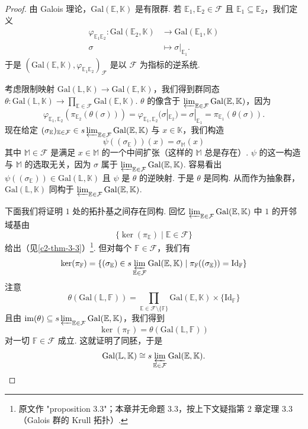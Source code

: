 \begin{proof}
由 Galois 理论，$\mathrm{Gal}(\mathbb{E},\mathbb{K})$ 是有限群. 若 $\mathbb{E}_1,\mathbb{E}_2\in\mathcal{F}$ 且 $\mathbb{E}_1\subseteq\mathbb{E}_2$，我们定义
\[
\begin{aligned}
\varphi_{\mathbb{E}_1\mathbb{E}_2}:\mathrm{Gal}(\mathbb{E}_2,\mathbb{K})&\longrightarrow\mathrm{Gal}(\mathbb{E}_1,\mathbb{K})\\
\sigma&\longmapsto\sigma|_{\mathbb{E}_1}.
\end{aligned}
\]
于是 $(\mathrm{Gal}(\mathbb{E},\mathbb{K}),\varphi_{\mathbb{E}_1\mathbb{E}_2})_{\mathcal{F}}$ 是以 $\mathcal{F}$ 为指标的逆系统.

考虑限制映射 $\mathrm{Gal}(\mathbb{L},\mathbb{K})\to\mathrm{Gal}(\mathbb{E},\mathbb{K})$，我们得到群同态 $\theta:\mathrm{Gal}(\mathbb{L},\mathbb{K})\to\prod_{\mathbb{E}\in\mathcal{F}}\mathrm{Gal}(\mathbb{E},\mathbb{K})$. $\theta$ 的像含于 $\varprojlim_{\mathbb{E}\in\mathcal{F}}\mathrm{Gal}(\mathbb{E},\mathbb{K})$，因为
\[
\varphi_{\mathbb{E}_1,\mathbb{E}_2}(\pi_{\mathbb{E}_2}(\theta(\sigma)))=\varphi_{\mathbb{E}_1,\mathbb{E}_2}(\sigma|_{\mathbb{E}_2})=\sigma|_{\mathbb{E}_1}=\pi_{\mathbb{E}_1}(\theta(\sigma)).
\]
现在给定 $(\sigma_\mathbb{E})_{\mathbb{E}\in\mathcal{F}}\in s\varprojlim_{\mathbb{E}\in\mathcal{F}}\mathrm{Gal}(\mathbb{E},\mathbb{K})$ 与 $x\in\mathbb{K}$，我们构造
\[
\psi((\sigma_\mathbb{E}))(x)=\sigma_\mathbb{M}(x)
\]
其中 $\mathbb{M}\in\mathcal{F}$ 是满足 $x\in\mathbb{M}$ 的一个中间扩张（这样的 $\mathbb{M}$ 总是存在）. $\psi$ 的这一构造与 $\mathbb{M}$ 的选取无关，因为 $\sigma$ 属于 $\varprojlim_{\mathbb{E}\in\mathcal{F}}\mathrm{Gal}(\mathbb{E},\mathbb{K})$. 容易看出 $\psi((\sigma_\mathbb{E}))\in\mathrm{Gal}(\mathbb{L},\mathbb{K})$ 且 $\psi$ 是 $\theta$ 的逆映射. 于是 $\theta$ 是同构. 从而作为抽象群，$\mathrm{Gal}(\mathbb{L},\mathbb{K})$ 同构于 $\varprojlim_{\mathbb{E}\in\mathcal{F}}\mathrm{Gal}(\mathbb{E},\mathbb{K})$.

下面我们将证明 $1$ 处的拓扑基之间存在同构. 回忆 $\varprojlim_{\mathbb{E}\in\mathcal{F}}\mathrm{Gal}(\mathbb{E},\mathbb{K})$ 中 $1$ 的开邻域基由
\[
\{\ker(\pi_\mathbb{E})\mid \mathbb{E}\in\mathcal{F}\}
\]
给出（见\autoref{c2-thm-3-3}）\footnote{原文作 "proposition 3.3"；本章并无命题 3.3，按上下文疑指第 2 章定理 3.3（Galois 群的 Krull 拓扑）.}. 但对每个 $\mathbb{F}\in\mathcal{F}$，我们有
\[
\ker(\pi_\mathbb{F})=\{(\sigma_\mathbb{E})\in s\varprojlim_{\mathbb{E}\in\mathcal{F}}\mathrm{Gal}(\mathbb{E},\mathbb{K})\mid \pi_\mathbb{F}((\sigma_\mathbb{E}))=\mathrm{Id}_\mathbb{F}\}
\]
注意
\[
\theta(\mathrm{Gal}(\mathbb{L},\mathbb{F}))=\prod_{\mathbb{E}\in\mathcal{F}\setminus\{\mathbb{F}\}}\mathrm{Gal}(\mathbb{E},\mathbb{K})\times\{\mathrm{Id}_\mathbb{F}\}
\]
且由 $\mathrm{im}(\theta)\subseteq s\varprojlim_{\mathbb{E}\in\mathcal{F}}\mathrm{Gal}(\mathbb{E},\mathbb{K})$，我们得到
\[
\ker(\pi_\mathbb{F})=\theta(\mathrm{Gal}(\mathbb{L},\mathbb{F}))
\]
对一切 $\mathbb{F}\in\mathcal{F}$ 成立. 这就证明了同胚，于是
\[
\mathrm{Gal}(\mathbb{L},\mathbb{K})\cong s\varprojlim_{\mathbb{E}\in\mathcal{F}}\mathrm{Gal}(\mathbb{E},\mathbb{K}).
\]
\end{proof}

